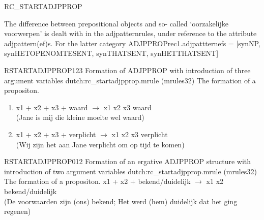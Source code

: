\begin{mruleclass}{RC\_STARTADJPPROP}
\begin{members}
\begin{member}
\remarks\mbox{}
The difference between prepositional objects and so-
called `oorzakelijke voorwerpen' is dealt with in the adjpatternrules, 
under reference to the attribute adjpattern(ef)s. 
For the latter category ADJPPROPrec1.adjpattternefs = 
                                         [synNP, synHETOPENOMTESENT, 
                                          synTHATSENT, synHETTHATSENT]

\end{member}
\begin{member}
 RSTARTADJPPROP123 
 Formation of ADJPPROP with introduction of three argument 
variables
\file dutch:rc\_startadjpprop.mrule (mrules32)
\semantics The formation of a propositon.
\example 

\mbox{}
\begin{enumerate}
  \item 
x1 + x2 + x3 + waard $\rightarrow$ x1 x2 x3 waard\\
(Jane is mij die kleine moeite wel waard)
  \item
x1 + x2 + x3 + verplicht $\rightarrow$ x1 x2 x3 verplicht\\
(Wij zijn het aan Jane verplicht om op tijd te komen)
\end{enumerate}

\remarks

\end{member}
\begin{member}
 RSTARTADJPPROP012 
 Formation of an ergative ADJPPROP structure with introduction 
of two argument variables
\file dutch:rc\_startadjpprop.mrule (mrules32)
\semantics The formation of a propositon.
\example x1 + x2 + bekend/duidelijk $\rightarrow$ x1 x2 bekend/duidelijk\\
(De voorwaarden zijn (ons) bekend; Het werd (hem) duidelijk dat het ging 
regenen)
\remarks

\end{member}
\end{members}


\end{mruleclass}

